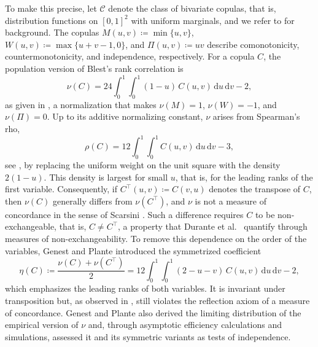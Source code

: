 \documentclass[11pt,a4paper]{article}
\theoremstyle{remark}
\newcommand{\de}{\,\mathrm{d}}
\newcommand{\1}{\mathbf{1}}
\newcommand{\CC}{\mathcal{C}}
\begin{document}
To make this precise, let $\CC$ denote the class of bivariate copulas, that is, distribution functions on $[0,1]^2$ with uniform marginals, and we refer to \cite{nelsen2006introduction,durante2016principles} for background.
The copulas $M(u,v)\coloneqq\min\{u,v\}$, $W(u,v)\coloneqq\max\{u+v-1,0\}$, and $\Pi(u,v)\coloneqq uv$ describe comonotonicity, countermonotonicity, and independence, respectively.
For a copula $C$, the population version of Blest's rank correlation is
\begin{equation}
  \label{eq:nu-def}
  \nu(C)=24\int_0^1\!\int_0^1(1-u)\,C(u,v)\de u\de v-2,
\end{equation}
as given in \cite[Sec.~3]{genest2003blest}, a normalization that makes $\nu(M)=1$, $\nu(W)=-1$, and $\nu(\Pi)=0$.
Up to its additive normalizing constant, $\nu$ arises from Spearman's rho,
\begin{equation}
  \label{eq:rho-def}
  \rho(C)=12\int_0^1\!\int_0^1 C(u,v)\de u\de v-3,
\end{equation}
see \cite[Sec.~5.1.2]{nelsen2006introduction}, by replacing the uniform weight on the unit square with the density $2(1-u)$.
This density is largest for small $u$, that is, for the leading ranks of the first variable.
Consequently, if $C^\top(u,v)\coloneqq C(v,u)$ denotes the transpose of $C$, then $\nu(C)$ generally differs from $\nu(C^\top)$, and $\nu$ is not a measure of concordance in the sense of Scarsini \cite{scarsini1984measures}.
Such a difference requires $C$ to be non-exchangeable, that is, $C\neq C^\top$, a property that Durante et al.~\cite{durante2010measures} quantify through measures of non-exchangeability.
To remove this dependence on the order of the variables, Genest and Plante \cite[Sec.~4]{genest2003blest} introduced the symmetrized coefficient
\begin{equation}
  \label{eq:eta-def}
  \eta(C)\coloneqq\frac{\nu(C)+\nu(C^\top)}{2}
  =12\int_0^1\!\int_0^1(2-u-v)\,C(u,v)\de u\de v-2,
\end{equation}
which emphasizes the leading ranks of both variables.
It is invariant under transposition but, as observed in \cite[Sec.~4]{genest2003blest}, still violates the reflection axiom of a measure of concordance.
Genest and Plante also derived the limiting distribution of the empirical version of $\nu$ and, through asymptotic efficiency calculations and simulations, assessed it and its symmetric variants as tests of independence.
\end{document}
